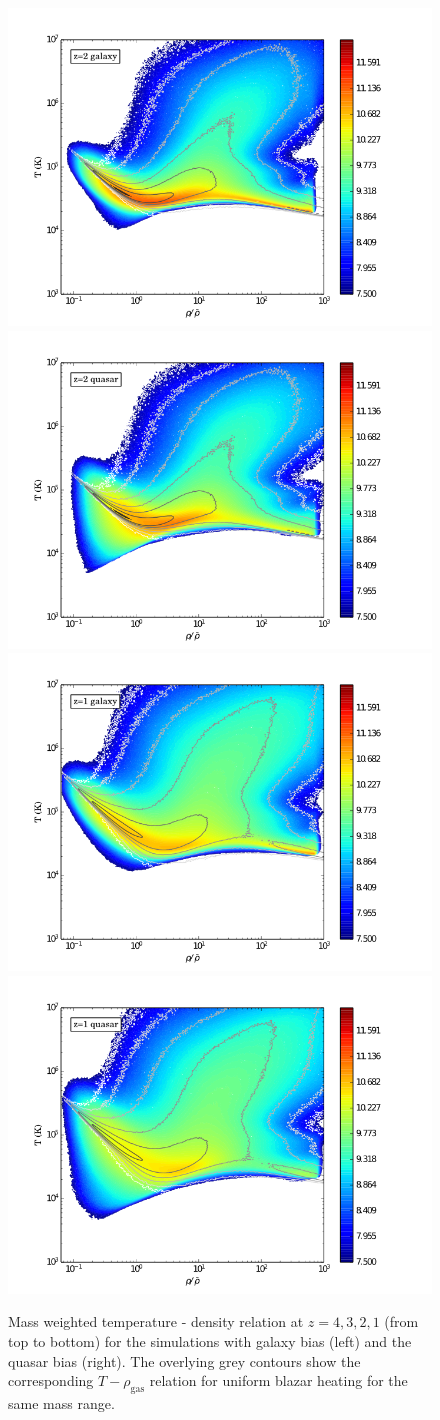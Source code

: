 \documentclass[numberedappendix]{emulateapj}
\begin{document}
\begin{figure}
\includegraphics[width = .42\textwidth ]{T_rho_z2_gal2_ok.png}
\includegraphics[width = .42\textwidth ]{T_rho_z2_qso4_ok.png}
\includegraphics[width = .42\textwidth ]{T_rho_z1_gal2_ok.png}
\includegraphics[width = .42\textwidth ]{T_rho_z1_qso4_ok.png}
\caption{Mass weighted temperature - density relation at $z=4,3,2,1$ (from top to bottom) for the simulations with galaxy bias (left) and the quasar bias (right). The overlying grey contours show the corresponding $T-\rho_{\mathrm{gas}}$ relation for uniform blazar heating \citep{2012MNRAS.423..149P} for the same mass range. }
\label{fig:T_rho}
\end{figure}
\end{document}
